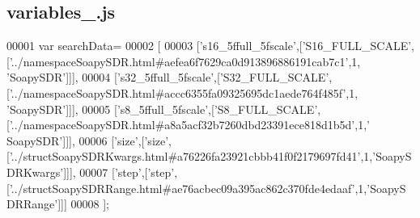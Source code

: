 \subsection{variables\+\_.\+js}
\label{variables__6_8js_source}

\begin{DoxyCode}
00001 var searchData=
00002 [
00003   [\textcolor{stringliteral}{'s16\_5ffull\_5fscale'},[\textcolor{stringliteral}{'S16\_FULL\_SCALE'},[\textcolor{stringliteral}{'../namespaceSoapySDR.html#aefea6f7629ca0d913896886191cab7c1'},1,\textcolor{stringliteral}{
      'SoapySDR'}]]],
00004   [\textcolor{stringliteral}{'s32\_5ffull\_5fscale'},[\textcolor{stringliteral}{'S32\_FULL\_SCALE'},[\textcolor{stringliteral}{'../namespaceSoapySDR.html#accc6355fa09325695dc1aede764f485f'},1,\textcolor{stringliteral}{
      'SoapySDR'}]]],
00005   [\textcolor{stringliteral}{'s8\_5ffull\_5fscale'},[\textcolor{stringliteral}{'S8\_FULL\_SCALE'},[\textcolor{stringliteral}{'../namespaceSoapySDR.html#a8a5acf32b7260dbd23391ece818d1b5d'},1,\textcolor{stringliteral}{'
      SoapySDR'}]]],
00006   [\textcolor{stringliteral}{'size'},[\textcolor{stringliteral}{'size'},[\textcolor{stringliteral}{'../structSoapySDRKwargs.html#a76226fa23921cbbb41f0f2179697fd41'},1,\textcolor{stringliteral}{'SoapySDRKwargs'}]]],
00007   [\textcolor{stringliteral}{'step'},[\textcolor{stringliteral}{'step'},[\textcolor{stringliteral}{'../structSoapySDRRange.html#ae76acbec09a395ac862c370fde4edaaf'},1,\textcolor{stringliteral}{'SoapySDRRange'}]]]
00008 ];
\end{DoxyCode}
